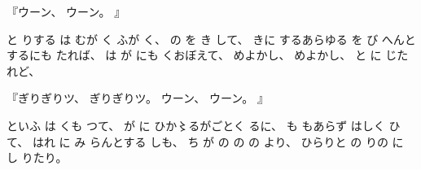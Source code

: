 『ウーン、
%
ウーン。
』

と
りする
は
むが
く
ふが
く、
%
の
を
き
して、
%
きに
するあらゆる
を
び
へんとするにも
たれば、
%
は
が
にも
くおぼえて、
%
めよかし、
%
めよかし、
%
と
に
じたれど、

『ぎりぎりツ、
%
ぎりぎりツ。
%
ウーン、
%
ウーン。
』

といふ
は
くも
つて、
%
が
に
ひか〻るがごとく
るに、
%
も
もあらず
はしく
ひて、
%
はれ
に
み
らんとする
しも、
%
ち
が
の
の
の
より、
%
ひらりと
の
りの
に
し
りたり。

